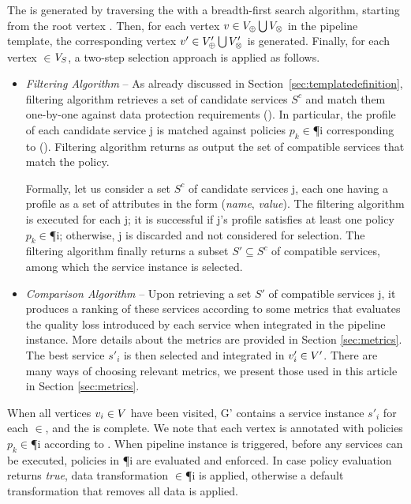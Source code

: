     The \pipelineInstance  is generated by traversing the \pipelineTemplate with a breadth-first search algorithm, starting from the root vertex .
    Then, for each vertex $v\in V_{\oplus}\bigcup V_{\otimes}$ in the pipeline template, the corresponding vertex $v'\in V'_{\oplus}\bigcup V'_{\otimes}$ is generated.
    Finally, for each vertex $\in$$V_S$, a two-step selection approach is applied as follows.
  \begin{itemize}

    \item \textit{Filtering Algorithm} -- As already discussed in Section~\ref{sec:templatedefinition}, filtering algorithm retrieves a set of candidate services $S^c$ and match them one-by-one against data protection requirements \myLambda(). In particular, the profile of each candidate service \si{j} is matched against policies $p_k$$\in$\P{i} corresponding to \myLambda(). Filtering algorithm returns as output the set of compatible services that match the policy.

                Formally, let us consider a set $S^c$ of candidate services \si{j}, each one having a profile as a set of attributes in the form (\emph{name}, \emph{value}). The filtering algorithm is executed for each \si{j}; it is successful if \si{j}'s profile satisfies at least one policy $p_k$$\in$\P{i}; otherwise, \si{j} is discarded and not considered for selection. The filtering algorithm finally returns a subset $S'\subseteq S^c$ of compatible services, among which the service instance is selected.

    \item \textit{Comparison Algorithm} -- Upon retrieving a set $S'$ of compatible services \si{j}, it produces a ranking of these services according to some metrics that evaluates the quality loss introduced by each service when integrated in the pipeline instance. More details about the metrics are provided in Section \ref{sec:metrics}.
          The best service $s'_i$ is then selected and integrated in $v'_{i}\in V'$. There are many ways of choosing relevant metrics, we present those used in this article in Section \ref{sec:metrics}.
  \end{itemize}

  When all vertices $v_{i}\in V$ have been visited, G' contains a service instance $s'_i$ for each $\in$\Vp, and the \pipelineInstance is complete. We note that each vertex  is annotated with policies $p_k$$\in$\P{i} according to \myLambda. When pipeline instance is triggered, before any services can be executed, policies in \P{i} are evaluated and enforced. In case policy evaluation returns \emph{true}, data transformation \TP$\in$\P{i} is applied, otherwise a default transformation that removes all data is applied.


